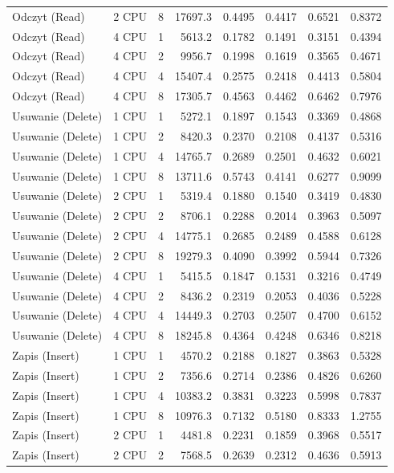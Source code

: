 \begin{table}[ht]
{\begin{tabular}{llcrrrrr}
Odczyt (Read) & 2 CPU & 8 & 17697.3 & 0.4495 & 0.4417 & 0.6521 & 0.8372 \\
Odczyt (Read) & 4 CPU & 1 & 5613.2 & 0.1782 & 0.1491 & 0.3151 & 0.4394 \\
Odczyt (Read) & 4 CPU & 2 & 9956.7 & 0.1998 & 0.1619 & 0.3565 & 0.4671 \\
Odczyt (Read) & 4 CPU & 4 & 15407.4 & 0.2575 & 0.2418 & 0.4413 & 0.5804 \\
Odczyt (Read) & 4 CPU & 8 & 17305.7 & 0.4563 & 0.4462 & 0.6462 & 0.7976 \\
Usuwanie (Delete) & 1 CPU & 1 & 5272.1 & 0.1897 & 0.1543 & 0.3369 & 0.4868 \\
Usuwanie (Delete) & 1 CPU & 2 & 8420.3 & 0.2370 & 0.2108 & 0.4137 & 0.5316 \\
Usuwanie (Delete) & 1 CPU & 4 & 14765.7 & 0.2689 & 0.2501 & 0.4632 & 0.6021 \\
Usuwanie (Delete) & 1 CPU & 8 & 13711.6 & 0.5743 & 0.4141 & 0.6277 & 0.9099 \\
Usuwanie (Delete) & 2 CPU & 1 & 5319.4 & 0.1880 & 0.1540 & 0.3419 & 0.4830 \\
Usuwanie (Delete) & 2 CPU & 2 & 8706.1 & 0.2288 & 0.2014 & 0.3963 & 0.5097 \\
Usuwanie (Delete) & 2 CPU & 4 & 14775.1 & 0.2685 & 0.2489 & 0.4588 & 0.6128 \\
Usuwanie (Delete) & 2 CPU & 8 & 19279.3 & 0.4090 & 0.3992 & 0.5944 & 0.7326 \\
Usuwanie (Delete) & 4 CPU & 1 & 5415.5 & 0.1847 & 0.1531 & 0.3216 & 0.4749 \\
Usuwanie (Delete) & 4 CPU & 2 & 8436.2 & 0.2319 & 0.2053 & 0.4036 & 0.5228 \\
Usuwanie (Delete) & 4 CPU & 4 & 14449.3 & 0.2703 & 0.2507 & 0.4700 & 0.6152 \\
Usuwanie (Delete) & 4 CPU & 8 & 18245.8 & 0.4364 & 0.4248 & 0.6346 & 0.8218 \\
Zapis (Insert) & 1 CPU & 1 & 4570.2 & 0.2188 & 0.1827 & 0.3863 & 0.5328 \\
Zapis (Insert) & 1 CPU & 2 & 7356.6 & 0.2714 & 0.2386 & 0.4826 & 0.6260 \\
Zapis (Insert) & 1 CPU & 4 & 10383.2 & 0.3831 & 0.3223 & 0.5998 & 0.7837 \\
Zapis (Insert) & 1 CPU & 8 & 10976.3 & 0.7132 & 0.5180 & 0.8333 & 1.2755 \\
Zapis (Insert) & 2 CPU & 1 & 4481.8 & 0.2231 & 0.1859 & 0.3968 & 0.5517 \\
Zapis (Insert) & 2 CPU & 2 & 7568.5 & 0.2639 & 0.2312 & 0.4636 & 0.5913 \\

\end{tabular}}
\end{table}
